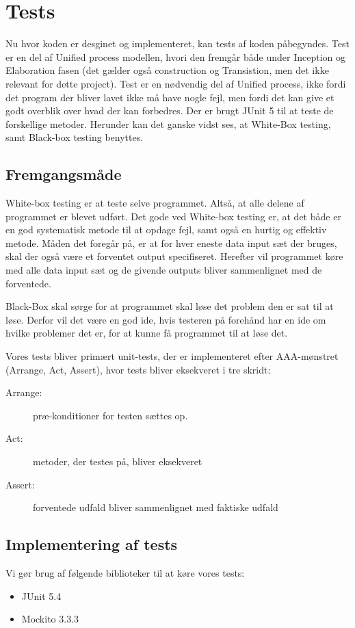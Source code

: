 \chapter{Tests}\label{ch:tests}
Nu hvor koden er desginet og implementeret, kan tests af koden påbegyndes. Test er en del af Unified process modellen, hvori den fremgår både under Inception og Elaboration fasen (det gælder også construction og Transistion, men det ikke relevant for dette project). Test er en nødvendig del af Unified process, ikke fordi det program der bliver lavet ikke må have nogle fejl, men fordi det kan give et godt overblik over hvad der kan forbedres\cite{sestoft2008systematic}. Der er brugt JUnit 5 til at teste de forskellige metoder. Herunder kan det ganske vidst ses, at White-Box testing, samt Black-box testing benyttes. 

\section{Fremgangsmåde}
White-box testing er at teste selve programmet. Altså, at alle delene af programmet er blevet udført. Det gode ved White-box testing er, at det både er en god systematisk metode til at opdage fejl, samt også en hurtig og effektiv metode. Måden det foregår på, er at for hver eneste data input sæt der bruges, skal der også være et forventet output specifiseret. Herefter vil programmet køre med alle data input sæt og de givende outputs bliver sammenlignet med de forventede\cite{sestoft2008systematic}.

Black-Box skal sørge for at programmet skal løse det problem den er sat til at løse. Derfor vil det være en god ide, hvis testeren på forehånd har en ide om hvilke problemer det er, for at kunne få programmet til at løse det\cite{sestoft2008systematic}. 

Vores tests bliver primært unit-tests, der er implementeret efter AAA-mønstret (Arrange, Act, Assert), hvor tests bliver eksekveret i tre skridt\cite{ArrangeActAssert}:
\begin{description}
    \item[Arrange:] præ-konditioner for testen sættes op.
    \item[Act:] metoder, der testes på, bliver eksekveret
    \item[Assert:] forventede udfald bliver sammenlignet med faktiske udfald 
\end{description}

\section{Implementering af tests}
Vi gør brug af følgende biblioteker til at køre vores tests:
\begin{itemize}
    \item JUnit 5.4
    \item Mockito 3.3.3
\end{itemize}

